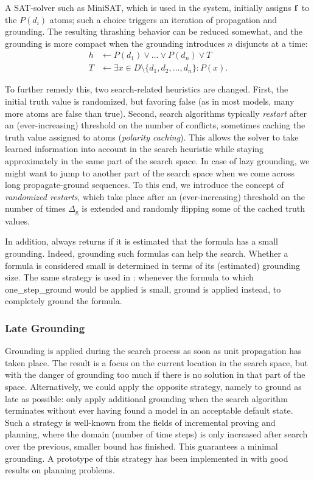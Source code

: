 \documentclass[11pt]{article}
\newcommand{\m}[1]{\ensuremath{#1}\xspace}
\newcommand{\trval}[1]{\m{{\bf #1}}}
\newcommand{\lrule}{\m{\leftarrow}}
\newcommand{\lfalse}{\trval{f}}
\newcommand{\D}{\m{\Delta}}
\newcommand{\typed}[2]{\m{#1\in #2:}}
\newcommand{\logicname}[1]{\text{\sc #1}\xspace}
\newcommand{\idp}{\logicname{IDP}}
\theoremstyle{plain}
\theoremstyle{definition}
\theoremstyle{example_basic}
\theoremstyle{example_contd}
\theoremstyle{plain}
\newcommand{\groundone}{\textsf{one\_step\_ground}\xspace}
\newcommand{\ground}{\textsf{ground}\xspace}
\newcommand{\Dg}{\ensuremath{\D_\text{g}}\xspace}
\newcommand{\change}[1]{#1}
\begin{document}
\change{A SAT-solver such as MiniSAT, which is used in the \idp
  system, initially assigns $\lfalse$ to the $P(d_i)$ atoms; such a
  choice triggers an iteration of propagation and grounding. The
  resulting thrashing behavior can be reduced somewhat, and the
  grounding is more compact when the grounding introduces $n$
  disjuncts at a time:}
\begin{align*}
h&\lrule P(d_1) \lor \ldots \lor P(d_n) \lor T \\
T &\lrule \exists\typed{x}{D \setminus \{d_1, d_2, \ldots, d_n\}} P(x).
\end{align*} 

To further remedy this, two search-related heuristics are changed.
First, the initial truth value is randomized, but favoring false (as in most models, many more atoms are false than true). 
Second, search algorithms typically \emph{restart} after an (ever-increasing) threshold on the number of conflicts, sometimes caching the truth value assigned to atoms (\emph{polarity caching}). This allows the solver to take learned information into account in the search heuristic while staying approximately in the same part of the search space. In case of lazy grounding, we might want to jump to another part of the search space when we come across long propagate-ground sequences. To this end, we introduce the concept of \emph{randomized restarts}, which take place after an (ever-increasing) threshold on the number of times \Dg is extended and randomly flipping some of the cached truth values.

In addition, \buildconstr always returns \algfalse if it is estimated that
the formula has a small grounding. Indeed, grounding such formulas
can help the search. Whether a formula is considered small is determined in terms of its (estimated) grounding size. The same strategy is used in \splitandground: whenever the formula to which \groundone would be applied is small, \ground is applied instead, to completely ground the formula. 

\subsubsection{Late Grounding} 
Grounding is applied during the search process as soon as unit propagation has taken place. The result is a focus on the current location in the search space, but with the danger of grounding too much if there is no solution in that part of the space. Alternatively, we could apply the opposite strategy, namely to ground as late as possible: only apply additional grounding when the search algorithm terminates without ever having found a model in an acceptable default state. Such a strategy is well-known from the fields of incremental proving and planning, where the domain (number of time steps) is only increased after search over the previous, smaller bound has finished. This guarantees a minimal grounding. A prototype of this strategy has been implemented in \idp with good results on planning problems.
\end{document}
